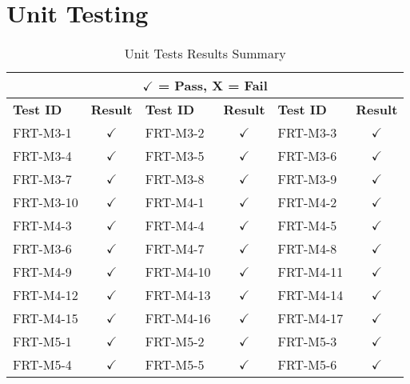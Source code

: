 \documentclass[12pt, titlepage]{article}
\begin{document}
\newpage

\section{Unit Testing}

\begin{longtable}{|l|c|l|c|l|c|}
	\caption{Unit Tests Results Summary} \label{Table Unit Tests Result Summary}                                 \\
	\toprule
	\multicolumn{6}{c}{$\checkmark$ = Pass, X = Fail}                                                            \\
	\toprule
	\textbf{Test ID} & \textbf{Result} & \textbf{Test ID} & \textbf{Result} & \textbf{Test ID} & \textbf{Result} \\
	\midrule
	FRT-M3-1         & $\checkmark$    & FRT-M3-2         & $\checkmark$    & FRT-M3-3         & $\checkmark$    \\
	\midrule
	FRT-M3-4         & $\checkmark$    & FRT-M3-5         & $\checkmark$    & FRT-M3-6         & $\checkmark$    \\
	\midrule
	FRT-M3-7         & $\checkmark$    & FRT-M3-8         & $\checkmark$    & FRT-M3-9         & $\checkmark$    \\
	\midrule
	FRT-M3-10        & $\checkmark$    & FRT-M4-1         & $\checkmark$    & FRT-M4-2         & $\checkmark$    \\
	\midrule
	FRT-M4-3         & $\checkmark$    & FRT-M4-4         & $\checkmark$    & FRT-M4-5         & $\checkmark$    \\
	\midrule
	FRT-M3-6         & $\checkmark$    & FRT-M4-7         & $\checkmark$    & FRT-M4-8         & $\checkmark$    \\
	\midrule
	FRT-M4-9         & $\checkmark$    & FRT-M4-10        & $\checkmark$    & FRT-M4-11        & $\checkmark$    \\
	\midrule
	FRT-M4-12        & $\checkmark$    & FRT-M4-13        & $\checkmark$    & FRT-M4-14        & $\checkmark$    \\
	\midrule
	FRT-M4-15        & $\checkmark$    & FRT-M4-16        & $\checkmark$    & FRT-M4-17        & $\checkmark$    \\
	\midrule
	FRT-M5-1         & $\checkmark$    & FRT-M5-2         & $\checkmark$    & FRT-M5-3         & $\checkmark$    \\
	\midrule
	FRT-M5-4         & $\checkmark$    & FRT-M5-5         & $\checkmark$    & FRT-M5-6         & $\checkmark$    \\

\end{longtable}
\end{document}
